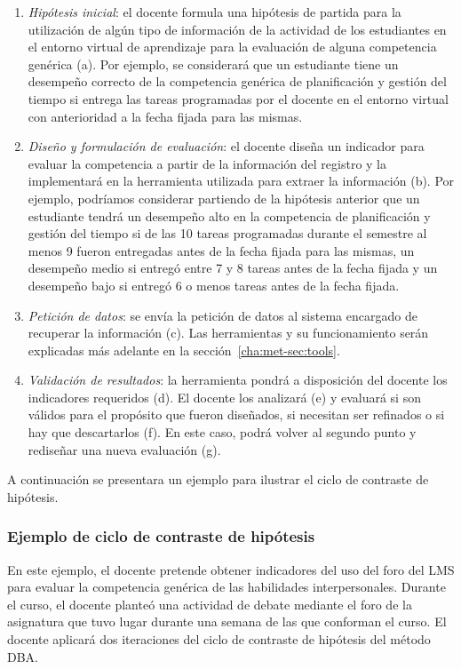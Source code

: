 \begin{enumerate}
\item \emph{Hipótesis inicial}: el docente formula una hipótesis de partida para la utilización de algún tipo de información de la actividad de los estudiantes en el entorno virtual de aprendizaje para la evaluación de alguna competencia genérica (a). Por ejemplo, se considerará que un estudiante tiene un desempeño correcto de la competencia genérica de planificación y gestión del tiempo si entrega las tareas programadas por el docente en el entorno virtual con anterioridad a la fecha fijada para las mismas.
\item \emph{Diseño y formulación de evaluación}: el docente diseña un indicador para evaluar la competencia a partir de la información del registro y la implementará en la herramienta utilizada para extraer la información (b). Por ejemplo, podríamos considerar partiendo de la hipótesis anterior que un estudiante tendrá un desempeño alto en la competencia de planificación y gestión del tiempo si de las 10 tareas programadas durante el semestre al menos 9 fueron entregadas antes de la fecha fijada para las mismas, un desempeño medio si entregó entre 7 y 8 tareas antes de la fecha fijada y un desempeño bajo si entregó 6 o menos tareas antes de la fecha fijada.
\item \emph{Petición de datos}: se envía la petición de datos al sistema encargado de recuperar la información (c). Las herramientas y su funcionamiento serán explicadas más adelante en la sección~\ref{cha:met-sec:tools}.
\item \emph{Validación de resultados}: la herramienta pondrá a disposición del docente los indicadores requeridos (d). El docente los analizará (e) y evaluará si son válidos para el propósito que fueron diseñados, si necesitan ser refinados o si hay que descartarlos (f). En este caso, podrá volver al segundo punto y rediseñar una nueva evaluación (g).
\end{enumerate}

A continuación se presentara un ejemplo para ilustrar el ciclo de contraste de hipótesis. 

\subsubsection*{Ejemplo de ciclo de contraste de hipótesis}

En este ejemplo, el docente pretende obtener indicadores del uso del foro del LMS para evaluar la competencia genérica de las habilidades interpersonales. Durante el curso, el docente planteó una actividad de debate mediante el foro de la asignatura que tuvo lugar durante una semana de las que conforman el curso. El docente aplicará dos iteraciones del ciclo de contraste de hipótesis del método DBA.

